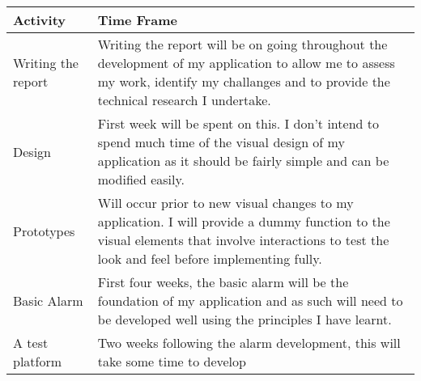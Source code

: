 \begin{longtable}[]{@{}ll@{}}
\toprule
\begin{minipage}[b]{0.20\columnwidth}\raggedright\strut
Activity\strut
\end{minipage} & \begin{minipage}[b]{0.74\columnwidth}\raggedright\strut
Time Frame\strut
\end{minipage}\tabularnewline
\midrule
\endhead
\begin{minipage}[t]{0.20\columnwidth}\raggedright\strut
Writing the report\strut
\end{minipage} & \begin{minipage}[t]{0.74\columnwidth}\raggedright\strut
Writing the report will be on going throughout the development of my
application to allow me to assess my work, identify my challanges and to
provide the technical research I undertake.\strut
\end{minipage}\tabularnewline
\begin{minipage}[t]{0.20\columnwidth}\raggedright\strut
Design\strut
\end{minipage} & \begin{minipage}[t]{0.74\columnwidth}\raggedright\strut
First week will be spent on this. I don't intend to spend much time of
the visual design of my application as it should be fairly simple and
can be modified easily.\strut
\end{minipage}\tabularnewline
\begin{minipage}[t]{0.20\columnwidth}\raggedright\strut
Prototypes\strut
\end{minipage} & \begin{minipage}[t]{0.74\columnwidth}\raggedright\strut
Will occur prior to new visual changes to my application. I will provide
a dummy function to the visual elements that involve interactions to
test the look and feel before implementing fully.\strut
\end{minipage}\tabularnewline
\begin{minipage}[t]{0.20\columnwidth}\raggedright\strut
Basic Alarm\strut
\end{minipage} & \begin{minipage}[t]{0.74\columnwidth}\raggedright\strut
First four weeks, the basic alarm will be the foundation of my
application and as such will need to be developed well using the
principles I have learnt.\strut
\end{minipage}\tabularnewline
\begin{minipage}[t]{0.20\columnwidth}\raggedright\strut
A test platform\strut
\end{minipage} & \begin{minipage}[t]{0.74\columnwidth}\raggedright\strut
Two weeks following the alarm development, this will take some time to
develop\strut
\end{minipage}\tabularnewline
\bottomrule
\end{longtable}

